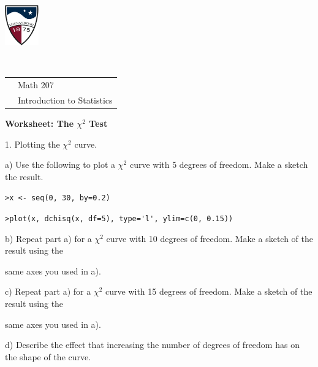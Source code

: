 \documentclass[10pt]{article}
\begin{document}
\pagestyle{empty}
\lstset{language=R, showspaces=false, showstringspaces=false}

\href{http://www.su.edu}{\includegraphics[height=1.75cm]{sulogo.eps}}
\vspace{-1.79cm}

{{\ }\hfill\small
\begin{tabular}{cl}
& Math 207\\
& Introduction to Statistics\\
\end{tabular}
}
\setlength{\baselineskip}{1.05\baselineskip}
\medskip

\begin{center}
\textbf{\large  Worksheet:  The $\chi^2$ Test}
\end{center}
\smallskip



1.  Plotting the $\chi^2$ curve.

\hspace{20pt} a) Use the following to plot a $\chi^2$ curve with
  5 degrees of freedom.  Make a sketch the result.

\hspace{40pt}  \lstinline!>x <- seq(0, 30, by=0.2)!

\hspace{40pt}  \lstinline!>plot(x, dchisq(x, df=5), type='l', ylim=c(0, 0.15))!
\vspace{1.5in}

\hspace{20pt} b) Repeat part a) for a $\chi^2$ curve with
  10 degrees of freedom.  Make a sketch of the result using the\vspace{-4pt}

\hspace{20pt}\hphantom{b) } same axes you
  used in a).

\hspace{20pt} c) Repeat part a) for a $\chi^2$ curve with
  15 degrees of freedom. Make a sketch of the result using the\vspace{-4pt}

\hspace{20pt}\hphantom{b) } same axes you
  used in a).

\hspace{20pt} d) Describe the effect that increasing the number of degrees of
  freedom has on the shape of the curve.
\vspace{.5in}
\end{document}
